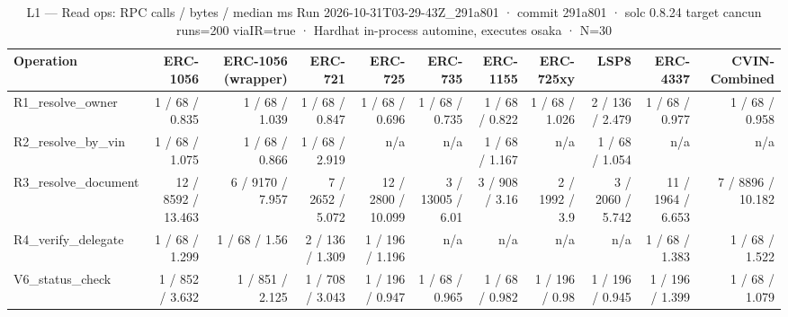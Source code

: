\begin{table}[ht]
\centering
\small
\begin{tabular}{lrrrrrrrrrr}
\toprule
Operation & ERC-1056 & ERC-1056 (wrapper) & ERC-721 & ERC-725 & ERC-735 & ERC-1155 & ERC-725xy & LSP8 & ERC-4337 & CVIN-Combined \\
\midrule
R1\_resolve\_owner & 1 / 68 / 0.835 & 1 / 68 / 1.039 & 1 / 68 / 0.847 & 1 / 68 / 0.696 & 1 / 68 / 0.735 & 1 / 68 / 0.822 & 1 / 68 / 1.026 & 2 / 136 / 2.479 & 1 / 68 / 0.977 & 1 / 68 / 0.958 \\
R2\_resolve\_by\_vin & 1 / 68 / 1.075 & 1 / 68 / 0.866 & 1 / 68 / 2.919 & n/a & n/a & 1 / 68 / 1.167 & n/a & 1 / 68 / 1.054 & n/a & n/a \\
R3\_resolve\_document & 12 / 8592 / 13.463 & 6 / 9170 / 7.957 & 7 / 2652 / 5.072 & 12 / 2800 / 10.099 & 3 / 13005 / 6.01 & 3 / 908 / 3.16 & 2 / 1992 / 3.9 & 3 / 2060 / 5.742 & 11 / 1964 / 6.653 & 7 / 8896 / 10.182 \\
R4\_verify\_delegate & 1 / 68 / 1.299 & 1 / 68 / 1.56 & 2 / 136 / 1.309 & 1 / 196 / 1.196 & n/a & n/a & n/a & n/a & 1 / 68 / 1.383 & 1 / 68 / 1.522 \\
V6\_status\_check & 1 / 852 / 3.632 & 1 / 851 / 2.125 & 1 / 708 / 3.043 & 1 / 196 / 0.947 & 1 / 68 / 0.965 & 1 / 68 / 0.982 & 1 / 196 / 0.98 & 1 / 196 / 0.945 & 1 / 196 / 1.399 & 1 / 68 / 1.079 \\
\bottomrule
\end{tabular}
\caption{L1 — Read ops: RPC calls / bytes / median ms Run 2026-10-31T03-29-43Z\_291a801 · commit 291a801 · solc 0.8.24 target cancun runs=200 viaIR=true · Hardhat in-process automine, executes osaka · N=30}
\label{tab:crud_reads}
\end{table}
